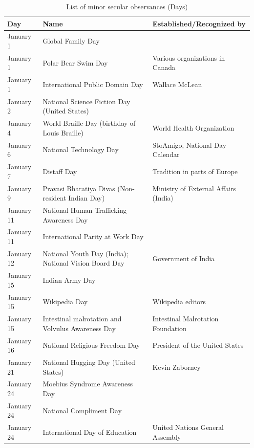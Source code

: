 \documentclass[
  openany]{book}
\begin{document}
\begin{longtable}[t]{>{\raggedright\arraybackslash}p{8em}>{\raggedright\arraybackslash}p{18em}>{\raggedright\arraybackslash}p{10em}}
\caption{\label{tab:day-observances}List of minor secular observances (Days)}\\
\toprule
Day & Name & Established/Recognized by\\
\midrule
\rowcolor{gray!6}  January 1 & Global Family Day & \\
January 1 & Polar Bear Swim Day & Various organizations in Canada\\
\rowcolor{gray!6}  January 1 & International Public Domain Day & Wallace McLean\\
January 2 & National Science Fiction Day (United States) & \\
\rowcolor{gray!6}  January 4 & World Braille Day (birthday of Louis Braille) & World Health Organization\\
\addlinespace
January 6 & National Technology Day & StoAmigo, National Day Calendar\\
\rowcolor{gray!6}  January 7 & Distaff Day & Tradition in parts of Europe\\
January 9 & Pravasi Bharatiya Divas (Non-resident Indian Day) & Ministry of External Affairs (India)\\
\rowcolor{gray!6}  January 11 & National Human Trafficking Awareness Day & \\
January 11 & International Parity at Work Day & \\
\addlinespace
\rowcolor{gray!6}  January 12 & National Youth Day (India); National Vision Board Day & Government of India\\
January 15 & Indian Army Day & \\
\rowcolor{gray!6}  January 15 & Wikipedia Day & Wikipedia editors\\
January 15 & Intestinal malrotation and Volvulus Awareness Day & Intestinal Malrotation Foundation\\
\rowcolor{gray!6}  January 16 & National Religious Freedom Day & President of the United States\\
\addlinespace
January 21 & National Hugging Day (United States) & Kevin Zaborney\\
\rowcolor{gray!6}  January 24 & Moebius Syndrome Awareness Day & \\
January 24 & National Compliment Day & \\
\rowcolor{gray!6}  January 24 & International Day of Education & United Nations General Assembly\\

\end{longtable}
\end{document}
